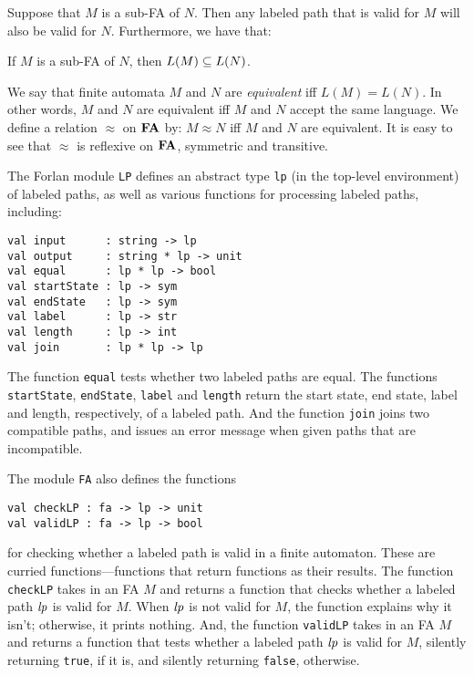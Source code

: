 Suppose that $M$ is a sub-FA of $N$.  Then any labeled path that is
valid for $M$ will also be valid for $N$.  Furthermore, we have that:

\begin{proposition}
If $M$ is a sub-FA of $N$, then $L(M)\subseteq L(N)$.
\end{proposition}

We say that finite automata $M$ and $N$ are \emph{equivalent} iff
$L(M) = L(N)$.  In other words, $M$ and $N$ are equivalent iff $M$ and
$N$ accept the same language.  We define a relation $\approx$ on $\mathbf{FA}$
by: $M\approx N$ iff $M$ and $N$ are equivalent.  It is easy to see
that $\approx$ is reflexive on $\mathbf{FA}$, symmetric and transitive.

The Forlan module \texttt{LP} defines an abstract type \texttt{lp} (in the
top-level environment) of labeled paths, as well as various functions
for processing labeled paths, including:
\begin{verbatim}
val input      : string -> lp
val output     : string * lp -> unit
val equal      : lp * lp -> bool
val startState : lp -> sym
val endState   : lp -> sym
val label      : lp -> str
val length     : lp -> int
val join       : lp * lp -> lp
\end{verbatim}
%
%
%
%
%
%
%
%
The function \texttt{equal} tests whether two labeled paths are
equal.  The functions \texttt{startState}, \texttt{endState},
\texttt{label} and \texttt{length} return the start state, end
state, label and length, respectively, of a labeled path.  And
the function \texttt{join} joins two compatible paths, and issues
an error message when given paths that are incompatible.

The module \texttt{FA} also defines the functions
\begin{verbatim}
val checkLP : fa -> lp -> unit
val validLP : fa -> lp -> bool
\end{verbatim}
%
%
for checking whether a labeled path is valid in a finite automaton.
These are curried functions---functions that return functions
as their results.
The function \texttt{checkLP} takes in an FA $M$ and returns a function
that checks whether a labeled path ${\it lp}$ is valid for $M$.  When
${\it lp}$ is not valid for $M$, the function explains why it isn't;
otherwise, it prints nothing. 
And, the function \texttt{validLP} takes in an FA $M$ and returns a function
that tests whether a labeled path ${\it lp}$ is valid for $M$, silently
returning \texttt{true}, if it is, and silently returning \texttt{false},
otherwise.

